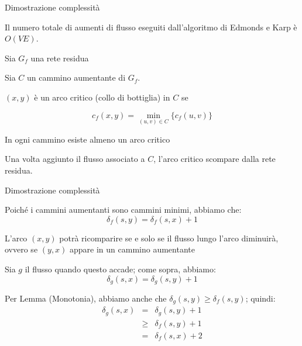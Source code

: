 \begin{frame}{Dimostrazione complessità}

\vspace{-9pt}
\begin{myboxtitle}
Il numero totale di aumenti di flusso eseguiti dall'algoritmo
di Edmonds e Karp è $O(VE)$.
\end{myboxtitle}

\BIL
\item Sia $G_f$ una rete residua
\item Sia $C$ un cammino aumentante di $G_f$. 
\item $(x,y)$ è un arco \alert{critico} (collo di bottiglia) in $C$ se 

\[
c_f(x,y) = \min_{(u,v) \in C} \{ c_f(u,v) \}
\]

\item In ogni cammino esiste almeno un arco critico
\item Una volta aggiunto il flusso associato a $C$, l'arco critico scompare dalla rete residua. 
\EIL

\end{frame}

\begin{frame}{Dimostrazione complessità}

\BIL
\item Poiché i cammini aumentanti sono cammini minimi, abbiamo che:
\[
 \delta_f(s,y) = \delta_f(s,x)+1
\]
\item L'arco $(x,y)$ potrà ricomparire se e solo se il flusso lungo l'arco 
diminuirà, ovvero se $(y,x)$ appare in un cammino aumentante
\item  Sia $g$ il flusso quando questo accade; come sopra, abbiamo:
\[
 \delta_{g}(s,x) = \delta_{g}(s,y)+1
\]
\item Per Lemma (Monotonia), abbiamo anche che $\delta_g(s,y)
\geq \delta_{f}(s,y)$; quindi:
\begin{eqnarray*}
\delta_{g}(s,x) &=& \delta_{g}(s,y)+1 \\
  & \geq & \delta_f(s,y) + 1 \\
  & = & \delta_f(s,x) + 2
\end{eqnarray*}
\EIL

\end{frame}

